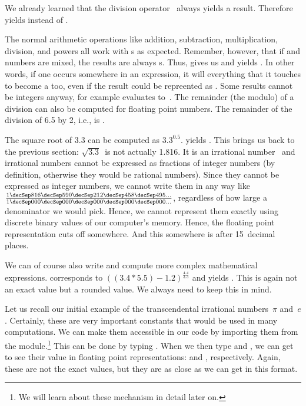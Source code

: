 We already learned that the division operator~\pythonil{/} always yields a  result.
Therefore  yields  instead of .

The normal arithmetic operations like addition, subtraction, multiplication, division, and powers all work with s as expected.
Remember, however, that if  and  numbers are mixed, the results are always s.
Thus,  gives us  and  yields .
In other words, if one  occurs somewhere in an expression, it will  everything that it touches to become a  too, even if the result could be repreented as .
Some results cannot be integers anyway, for example  evaluates to~.
The remainder (the modulo) of a division can also be computed for floating point numbers.
The remainder of the division of 6.5 by 2, i.e., \expandafter{} is .

The square root of 3.3 can be computed as $3.3^{0.5}$.
 yields .
This brings us back to the previous section:
$\sqrt{3.3}$~is not actually 1.816.
It is an irrational number~\cite{S1988WPCHD,B1991IWNT} and irrational numbers cannot be expressed as fractions of integer numbers (by definition, otherwise they would be rational numbers).
Since they cannot be expressed as integer numbers, we cannot write them in any way like $\frac{1\decSep816\decSep590\decSep212\decSep458\decSep495\dots}{1\decSep000\decSep000\decSep000\decSep000\decSep000\dots}$, regardless of how large a denominator we would pick.
Hence, we cannot represent them exactly using discrete binary values of our computer's memory.
Hence, the floating point representation cuts off somewhere.
And this somewhere is after 15~decimal places.%
%
\begin{sloppypar}%
We can of course also write and compute more complex mathematical expressions.
 corresponds to $((3.4*5.5)-1.2)^{\frac{4.4}{3.3}}$ and yields .
This is again not an exact value but a rounded value.
We always need to keep this in mind.%
\end{sloppypar}%
%
Let us recall our initial example of the transcendental irrational numbers~$\pi$ and~$e$.
Certainly, these are very important constants that would be used in many computations.
We can make them accessible in our code by importing them from the  module.\footnote{%
We will learn about these mechanism in detail later on.}
This can be done by typing .
When we then type  and , we can get to see their value in floating point representations:  and , respectively.
Again, these are not the exact values, but they are as close as we can get in this format.

